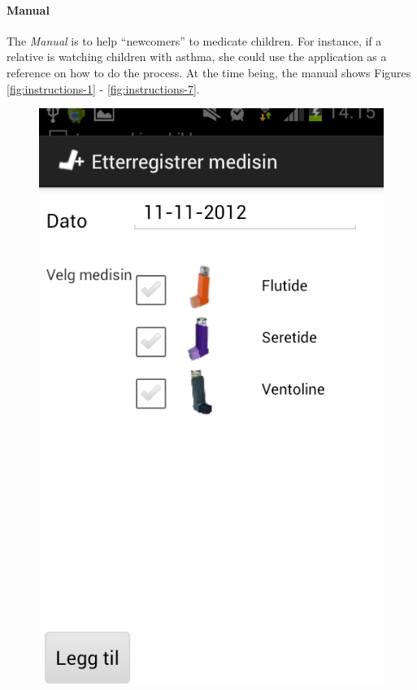 \paragraph{Manual}
The \emph{Manual} is to help ``newcomers'' to medicate children. For instance, if a relative is watching children with asthma, she could use the application as a reference on how to do the process. At the time being, the manual shows Figures \ref{fig:instructions-1} - \ref{fig:instructions-7}. 
        
\begin{figure}[H]
	\begin{minipage}[b]{0.3\linewidth}
		\centering
		\includegraphics[width=0.20\paperwidth]{Pictures/app-screenshots/register_treatment_old.png}

\end{minipage}
\end{figure}
